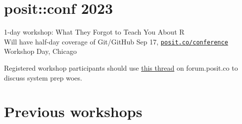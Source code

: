 \documentclass[
]{book}
\begin{document}
\section{posit::conf 2023}\label{positconf-2023}

1-day workshop: What They Forgot to Teach You About R\\
Will have half-day coverage of Git/GitHub
Sep 17, \href{https://posit.co/conference/}{\texttt{posit.co/conference}} Workshop Day, Chicago

Registered workshop participants should use \href{https://forum.posit.co/t/what-they-forgot-to-teach-you-about-r-workshop-rstudio-conf-2022/138999}{this thread} on forum.posit.co to discuss system prep woes.

\section{Previous workshops}\label{previous-workshops}
\end{document}

